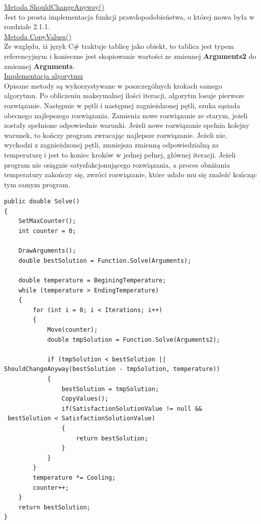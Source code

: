 \documentclass[twoside]{projektInzynierskiMS1}
\newcommand{\si}{ś}
\begin{document}
\underline{Metoda ShouldChangeAnyway()} \\
Jest to prosta implementacja funkcji prawdopodobieństwa, o której mowa była w rozdziale 2.1.1. \\

\underline{Metoda CopyValues()} \\
Ze względu, iż język C\# traktuje tablicę jako obiekt, to tablica jest typem referencyjnym i konieczne jest skopiowanie warto\si ci ze zmiennej \textbf{Arguments2} do zmiennej \textbf{Arguments}. \\

\underline{Implementacja algorytmu} \\
Opisane metody są wykorzystywane w poszczególnych krokach samego algorytmu. Po obliczeniu maksymalnej ilo\si ci iteracji, algorytm losuje pierwsze rozwiązanie. Następnie w pętli i następnej zagnieżdzonej pętli, szuka sąsiada obecnego najlepszego rozwiązania. Zamienia nowe rozwiązanie ze starym, jeżeli zostały spełnione odpowiednie warunki. Jeżeli nowe rozwiązanie spełnia kolejny warunek, to kończy program zwracając najlepsze rozwiązanie. Jeżeli nie, wychodzi z zagnieżdzonej pętli, zmniejsza zmienną odpowiedzialną za temperaturę i jest to koniec kroków w jednej pełnej, głównej iteracji. Jeżeli program nie osiągnie satysfakcjonującego rozwiązania, a proces obniżania temperatury zakończy się, zwróci rozwiązanie, które udało mu się znaleźć kończąc tym samym program.

\begin{verbatim}
public double Solve()
{
    SetMaxCounter();
    int counter = 0;

    DrawArguments();
    double bestSolution = Function.Solve(Arguments);

    double temperature = BeginingTemperature;
    while (temperature > EndingTemperature)
    {
        for (int i = 0; i < Iterations; i++)
        {
            Move(counter);
            double tmpSolution = Function.Solve(Arguments2);

            if (tmpSolution < bestSolution || 
ShouldChangeAnyway(bestSolution - tmpSolution, temperature))
            {
                bestSolution = tmpSolution;
                CopyValues();
                if(SatisfactionSolutionValue != null &&
 bestSolution < SatisfactionSolutionValue)
                {
                    return bestSolution;
                }
            }
        }
        temperature *= Cooling;
        counter++;
    }
    return bestSolution;
}
\end{verbatim}
\end{document}
